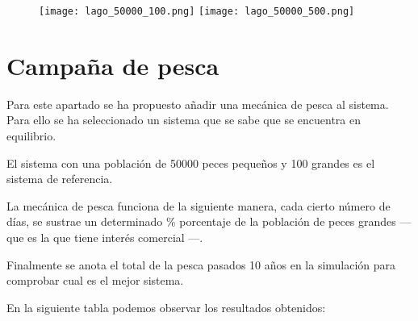 \newpage

\begin{figure}[h!]
\texttt{[image: lago\_50000\_100.png]}
\texttt{[image: lago\_50000\_500.png]}
\centering
\end{figure}

\newpage

\section{Campaña de pesca}

Para este apartado se ha propuesto añadir una mecánica de pesca al sistema. Para ello se ha seleccionado un sistema que se sabe que se encuentra en equilibrio.

El sistema con una población de 50000 peces pequeños y 100 grandes es el sistema de referencia.


La mecánica de pesca funciona de la siguiente manera, cada cierto número de días, se sustrae un determinado \% porcentaje de la población de peces grandes --- que es la que tiene interés comercial ---.

Finalmente se anota el total de la pesca pasados 10 años en la simulación para comprobar cual es el mejor sistema.

En la siguiente tabla podemos observar los resultados obtenidos:
\begin{table}[h]
\centering
{}
\end{table}


